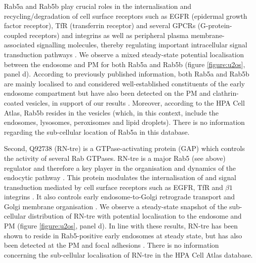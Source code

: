 \documentclass[12pt,english]{article}
\begin{document}
Rab5a and Rab5b play crucial roles in the internalisation and recycling/degradation of cell surface receptors such as EGFR (epidermal growth factor receptor), TfR (transferrin receptor) and several GPCRs (G-protein-coupled receptors) and integrins as well as peripheral plasma membrane-associated signalling molecules, thereby regulating important intracellular signal transduction pathways \citep{Trischler::1999, Chen::2009, Bastin::2013, Liu::2015}. We observe a mixed steady-state potential localisation between the endosome and PM for both Rab5a and Rab5b (figure \ref{figure:u2os}, panel d). According to previously published information, both Rab5a and Rab5b are mainly localised to and considered well-established constituents of the early endosome compartment but have also been detected on the PM and clathrin-coated vesicles, in support of our results \citep{Simonsen::1998, Woodman::2000, Mendoza::2013}. Moreover, according to the HPA Cell Atlas, Rab5b resides in the vesicles (which, in this context, include the endosomes, lysosomes, peroxisomes and lipid droplets). There is no information regarding the sub-cellular location of Rab5a in this database.  

Second, Q92738 (RN-tre) is a GTPase-activating protein (GAP) which controls the activity of several Rab GTPases. RN-tre is a major Rab5 (see above) regulator and therefore a key player in the organisation and dynamics of the endocytic pathway \citep{Lanzetti::2000, Gautreau::2014}. This protein modulates the internalisation of and signal transduction mediated by cell surface receptors such as EGFR, TfR and $\beta 1$ integrins \citep{Lanzetti::2000, Martinu::2002, Palamidessi::2013, De::2015}. It also controls early endosome-to-Golgi retrograde transport and Golgi membrane organisation \citep{Haas::2007}. We observe a steady-state snapshot of the sub-cellular distribution of RN-tre with potential localisation to the endosome and PM (figure \ref{figure:u2os}, panel d). In line with these results, RN-tre has been shown to reside in Rab5-positive early endosomes at steady state, but has also been detected at the PM and focal adhesions \citep{Lanzetti::2000,Martinu::2002, Palamidessi::2013,Gautreau::2014, De::2015}. There is no information concerning the sub-cellular localisation of RN-tre in the HPA Cell Atlas database. 
\end{document}
